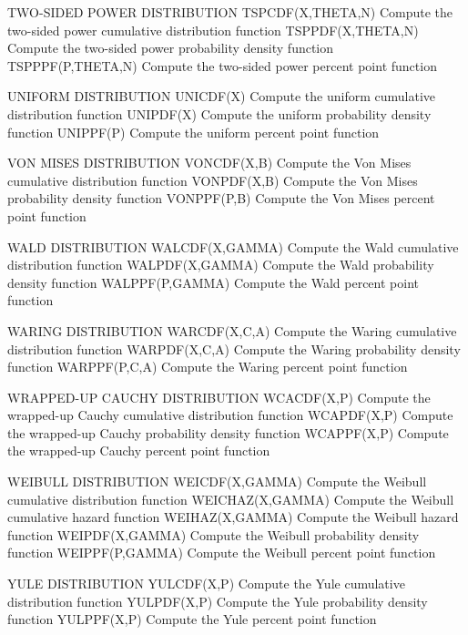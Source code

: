 TWO-SIDED POWER DISTRIBUTION
   TSPCDF(X,THETA,N)  Compute the two-sided power cumulative
                      distribution function
   TSPPDF(X,THETA,N)  Compute the two-sided power probability density
                      function
   TSPPPF(P,THETA,N)  Compute the two-sided power percent point
                      function

UNIFORM DISTRIBUTION
   UNICDF(X)          Compute the uniform cumulative distribution
                      function
   UNIPDF(X)          Compute the uniform probability density function
   UNIPPF(P)          Compute the uniform percent point function

VON MISES DISTRIBUTION
   VONCDF(X,B)        Compute the Von Mises cumulative distribution
                      function
   VONPDF(X,B)        Compute the Von Mises probability density
                      function
   VONPPF(P,B)        Compute the Von Mises percent point function

WALD DISTRIBUTION
   WALCDF(X,GAMMA)    Compute the Wald cumulative distribution function
   WALPDF(X,GAMMA)    Compute the Wald probability density function
   WALPPF(P,GAMMA)    Compute the Wald percent point function
 
WARING DISTRIBUTION
   WARCDF(X,C,A)      Compute the Waring cumulative distribution
                      function
   WARPDF(X,C,A)      Compute the Waring probability density function
   WARPPF(P,C,A)      Compute the Waring percent point function
 
WRAPPED-UP CAUCHY DISTRIBUTION
   WCACDF(X,P)        Compute the wrapped-up Cauchy cumulative
                      distribution function
   WCAPDF(X,P)        Compute the wrapped-up Cauchy probability
                      density function
   WCAPPF(X,P)        Compute the wrapped-up Cauchy percent point
                      function

WEIBULL DISTRIBUTION
   WEICDF(X,GAMMA)    Compute the Weibull cumulative distribution
                      function
   WEICHAZ(X,GAMMA)   Compute the Weibull cumulative hazard function
   WEIHAZ(X,GAMMA)    Compute the Weibull hazard function
   WEIPDF(X,GAMMA)    Compute the Weibull probability density function
   WEIPPF(P,GAMMA)    Compute the Weibull percent point function
 
YULE DISTRIBUTION
   YULCDF(X,P)        Compute the Yule cumulative distribution
                      function
   YULPDF(X,P)        Compute the Yule probability density function
   YULPPF(X,P)        Compute the Yule percent point function
 
